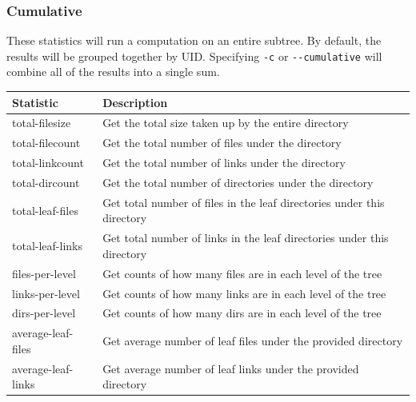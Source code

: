 \subsubsection{Cumulative}
These statistics will run a computation on an entire subtree. By
default, the results will be grouped together by UID. Specifying
\texttt{-c} or \texttt{-{}-cumulative} will combine all of the results
into a single sum.
\\
\begin{tabularx}{\textwidth}{| l | X |}
  \hline
  Statistic & Description \\
  \hline
  total-filesize & Get the total size taken up by the entire directory
  \\
  \hline
  total-filecount & Get the total number of files under the directory \\
  \hline
  total-linkcount & Get the total number of links under the directory \\
  \hline
  total-dircount & Get the total number of directories under the
  directory \\
  \hline
  total-leaf-files & Get total number of files in the leaf directories
  under this directory \\
  \hline
  total-leaf-links & Get total number of links in the leaf directories
  under this directory \\
  \hline
  files-per-level & Get counts of how many files are in each level of
  the tree \\
  \hline
  links-per-level & Get counts of how many links are in each level of
  the tree \\
  \hline
  dirs-per-level & Get counts of how many dirs are in each level of the
  tree \\
  \hline
  average-leaf-files & Get average number of leaf files under the
  provided directory \\
  \hline
  average-leaf-links & Get average number of leaf links under the
  provided directory \\
  \hline
\end{tabularx}

